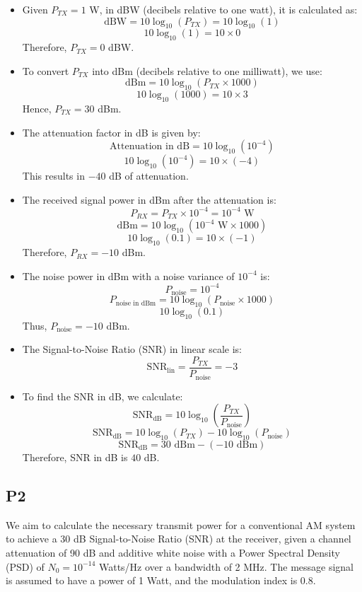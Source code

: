 \documentclass{article}
\begin{document}
\begin{itemize}
    \item[a)] Given \( P_{TX} = 1 \) W, in dBW (decibels relative to one watt), it is calculated as:
    \[ \text{dBW} = 10 \log_{10}(P_{TX}) = 10 \log_{10}(1) \]
    \[ 10 \log_{10}(1) = 10 \times 0 \]
    Therefore, \( P_{TX} = 0 \) dBW.

    \item[b)] To convert \( P_{TX} \) into dBm (decibels relative to one milliwatt), we use:
    \[ \text{dBm} = 10 \log_{10}(P_{TX} \times 1000) \]
    \[ 10 \log_{10}(1000) = 10 \times 3 \]
    Hence, \( P_{TX} = 30 \) dBm.

    \item[c)] The attenuation factor in dB is given by:
    \[ \text{Attenuation in dB} = 10 \log_{10}(10^{-4}) \]
    \[ 10 \log_{10}(10^{-4}) = 10 \times (-4) \]
    This results in \( -40 \) dB of attenuation.

    \item[d)] The received signal power in dBm after the attenuation is:
    \[ P_{RX} = P_{TX} \times 10^{-4} = 10^{-4} \text{ W} \]
    \[ \text{dBm} = 10 \log_{10}(10^{-4} \text{ W} \times 1000) \]
    \[ 10 \log_{10}(0.1) = 10 \times (-1) \]
    Therefore, \( P_{RX} = -10 \) dBm.

    \item[e)] The noise power in dBm with a noise variance of \( 10^{-4} \) is:
    \[ P_{\text{noise}} = 10^{-4} \]
    \[ P_{\text{noise in dBm}} = 10 \log_{10}(P_{\text{noise}} \times 1000) \]
    \[ 10 \log_{10}(0.1) \]
    Thus, \( P_{\text{noise}} = -10 \) dBm.

    \item[f)] The Signal-to-Noise Ratio (SNR) in linear scale is:
    \[ \text{SNR}_{\text{lin}} = \frac{P_{TX}}{P_{\text{noise}}} = -3 \]

    \item[g)] To find the SNR in dB, we calculate:
    \[ \text{SNR}_{\text{dB}} = 10 \log_{10}\left(\frac{P_{TX}}{P_{\text{noise}}}\right) \]
    \[ \text{SNR}_{\text{dB}} = 10 \log_{10}(P_{TX}) - 10 \log_{10}(P_{\text{noise}}) \]
    \[ \text{SNR}_{\text{dB}} = 30 \text{ dBm} - (-10 \text{ dBm}) \]
    Therefore, SNR in dB is \( 40 \) dB.
\end{itemize}
\newpage
\subsection*{P2}
We aim to calculate the necessary transmit power for a conventional AM system to achieve a 30 dB Signal-to-Noise Ratio (SNR) at the receiver, given a channel attenuation of 90 dB and additive white noise with a Power Spectral Density (PSD) of \( N_0 = 10^{-14} \) Watts/Hz over a bandwidth of 2 MHz. The message signal is assumed to have a power of 1 Watt, and the modulation index is 0.8.
\end{document}
